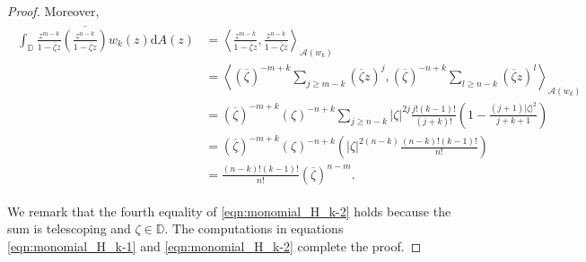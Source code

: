 \documentclass[10pt,a4paper]{amsart}
\newcommand{\D}{\mathbb D}
\newcommand{\abs}[1]{\left\lvert #1 \right\rvert}
\newcommand{\calA}{{\mathcal{A}}}
\newcommand{\ip}[1]{\left\langle #1 \right\rangle}
\renewcommand{\ge}{\geqslant}
\begin{document}
\begin{proof}
    Moreover,
    \begin{align}
        \begin{split}
            \int_{\D} \frac{z^{m-k}}{1-\overline{\zeta} z} \overline{\left(  \frac{z^{n-k}}{1-\overline{\zeta} z} \right)} w_{k} \left( z \right) \mathrm{d}A \left( z \right) 
            &= \ip{\frac{z^{m-k}}{1 -\overline{\zeta} z},\frac{z^{n-k}}{1-\overline{\zeta} z}}_{\calA (w_k)} \\
            &= \ip{ (\overline{\zeta})^{-m+k} \sum_{j \ge m-k} \left( \overline{\zeta}z \right)^j , (\overline{\zeta})^{-n+k} \sum_{l \ge n-k} \left( \overline{\zeta}z \right)^l }_{\calA (w_k)} \\
            &= (\overline{\zeta})^{-m+k} (\zeta)^{-n+k} \sum_{j \ge n-k} \abs{\zeta}^{2j} \frac{j! (k-1)!}{(j+k)!} \left( 1- \frac{\left( j+1 \right) \abs{\zeta}^{2}}{j+k+1} \right) \\
            &=  (\overline{\zeta})^{-m+k} (\zeta)^{-n+k} \left( \abs{\zeta}^{2(n-k)} \frac{(n-k)! (k-1)!}{n!} \right) \\
            &=  \frac{(n-k)! (k-1)!}{n!} (\overline{\zeta})^{n-m}.
        \end{split}
        \label{eqn:monomial_H_k-2}
    \end{align}

    We remark that the fourth equality of \eqref{eqn:monomial_H_k-2} holds because the sum is telescoping and $\zeta \in \D$. The computations in equations \eqref{eqn:monomial_H_k-1} and \eqref{eqn:monomial_H_k-2} complete the proof.
\end{proof}
\end{document}
